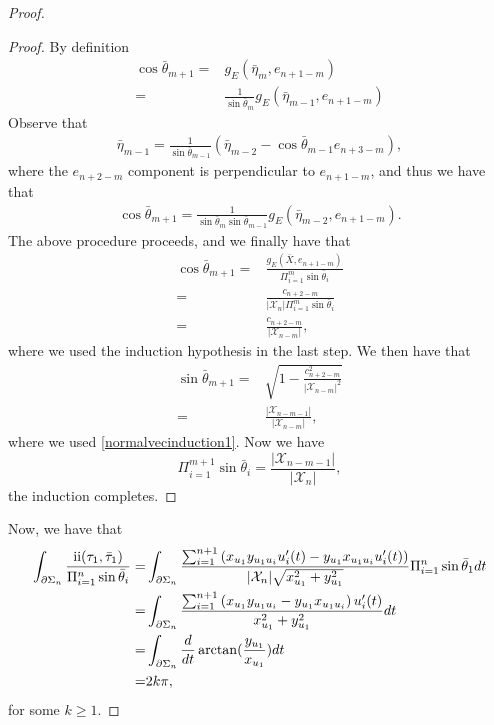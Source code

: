 \documentclass[11pt,letterpaper]{amsart}
\newcommand{\RN}[1]{%
  \textup{\uppercase\expandafter{\romannumeral#1}}%
}
\begin{document}
\begin{proof}
\begin{proof}
By definition 
\begin{align*}
    \cos\bar{\theta}_{m+1}=&g_E(\bar{\eta}_{m},e_{n+1-m})\\
                          =&\frac{1}{\sin\bar{\theta}_m}g_E(\bar{\eta}_{m-1},e_{n+1-m})
\end{align*}
Observe that 
\begin{align*}
    \bar{\eta}_{m-1}=\frac{1}{\sin\bar{\theta}_{m-1}}\left(\bar{\eta}_{m-2}-\cos\bar{\theta}_{m-1}e_{n+3-m}\right),
\end{align*}
where the $e_{n+2-m}$ component is perpendicular to $e_{n+1-m}$, and thus we have that
\begin{align*}
    \cos\bar{\theta}_{m+1}=\frac{1}{\sin\bar{\theta}_{m}\sin\bar{\theta}_{m-1}}g_E(\bar{\eta}_{m-2},e_{n+1-m}).
\end{align*}
The above procedure proceeds, and we finally have that
\begin{align*}
    \cos\bar{\theta}_{m+1}=&\frac{g_E(\bar{X},e_{n+1-m})}{\Pi_{i=1}^{m}\sin\bar{\theta}_i}\\
    =&\frac{c_{n+2-m}}{|\mathcal{X}_n|\Pi_{i=1}^m\sin\bar{\theta}_i}\\
    =&\frac{c_{n+2-m}}{|\mathcal{X}_{n-m}|},
\end{align*}
where we used the induction hypothesis in the last step.
We then have that
\begin{align*}
    \sin\bar{\theta}_{m+1}=&\sqrt{1-\frac{c_{n+2-m}^2}{|\mathcal{X}_{n-m}|^2}}\\
    =&\frac{|\mathcal{X}_{n-m-1}|}{|\mathcal{X}_{n-m}|},
\end{align*}
where we used \eqref{normalvecinduction1}.
Now we have 
\[
\Pi_{i=1}^{m+1}\sin\bar{\theta}_i=\frac{|\mathcal{X}_{n-m-1}|}{|\mathcal{X}_n|},
\]
the induction completes.
\end{proof}
Now, we have that
\begin{align*}
    \int_{\partial\Sigma_n}\frac{\RN{2}(\tau_1,\bar{\tau}_1)}{\Pi_{i=1}^{n}\sin\bar{\theta}_i}=&\int_{\partial\Sigma_n}
    \frac{\sum_{i=1}^{n+1}\left(x_{u_1}y_{u_1u_i}u_i'(t)-y_{u_1}x_{u_1u_{i}}u_i'(t)\right)}{|\mathcal{X}_n|\sqrt{x_{u_1}^2+y_{u_1}^2}}\Pi_{i=1}^{n}\sin\bar{\theta}_1dt\\
    =&\int_{\partial\Sigma_n}\frac{\sum_{i=1}^{n+1}\left(x_{u_1}y_{u_1u_i}-y_{u_1}x_{u_1u_i}\right)u_i'(t)}{x_{u_1}^2+y_{u_1}^2}dt\\
    =&\int_{\partial\Sigma_n}\frac{d}{dt}\arctan(\frac{y_{u_1}}{x_{u_1}})dt\\
    =&2k\pi,
\end{align*}
for some $k\geq 1$.
\end{proof}
\end{document}
